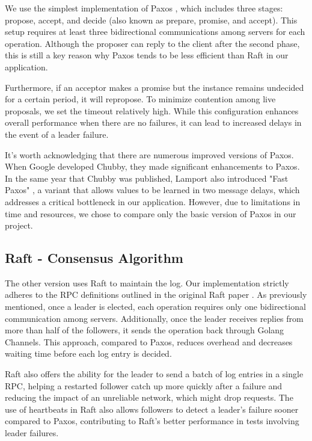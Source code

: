 \documentclass[11pt,a4paper]{article}
\begin{document}
We use the simplest implementation of Paxos \cite{lamport1998paxos,lamport2001paxos}, which includes three stages: propose, accept, and decide (also known as prepare, promise, and accept). This setup requires at least three bidirectional communications among servers for each operation. Although the proposer can reply to the client after the second phase, this is still a key reason why Paxos tends to be less efficient than Raft in our application.

Furthermore, if an acceptor makes a promise but the instance remains undecided for a certain period, it will repropose. To minimize contention among live proposals, we set the timeout relatively high. While this configuration enhances overall performance when there are no failures, it can lead to increased delays in the event of a leader failure.

It's worth acknowledging that there are numerous improved versions of Paxos. When Google developed Chubby, they made significant enhancements to Paxos. In the same year that Chubby was published, Lamport also introduced "Fast Paxos" \cite{lamport2006fast} , a variant that allows values to be learned in two message delays, which addresses a critical bottleneck in our application. However, due to limitations in time and resources, we chose to compare only the basic version of Paxos in our project.

\subsection{Raft - Consensus Algorithm}\label{subsecRaft}
The other version uses Raft to maintain the log. Our implementation strictly adheres to the RPC definitions outlined in the original Raft paper \cite{ongaro2014raft}. As previously mentioned, once a leader is elected, each operation requires only one bidirectional communication among servers. Additionally, once the leader receives replies from more than half of the followers, it sends the operation back through Golang Channels. This approach, compared to Paxos, reduces overhead and decreases waiting time before each log entry is decided.

Raft also offers the ability for the leader to send a batch of log entries in a single RPC, helping a restarted follower catch up more quickly after a failure and reducing the impact of an unreliable network, which might drop requests. The use of heartbeats in Raft also allows followers to detect a leader's failure sooner compared to Paxos, contributing to Raft's better performance in tests involving leader failures.
\end{document}
